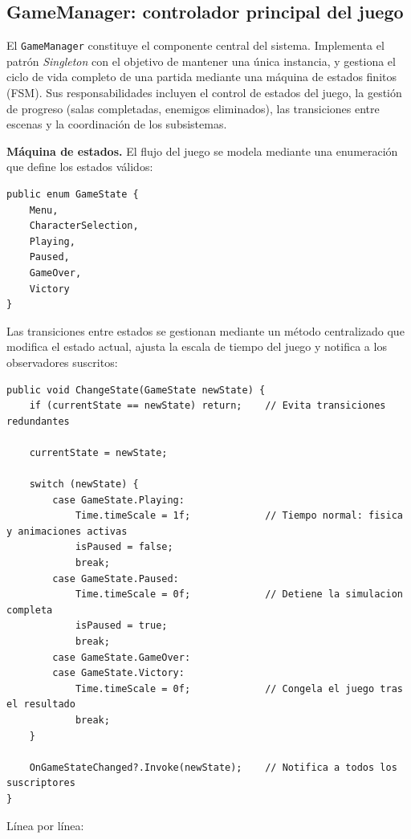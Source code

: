 \subsection{GameManager: controlador principal del juego}


El \texttt{GameManager} constituye el componente central del sistema. Implementa el patrón \textit{Singleton} con el objetivo de mantener una única instancia, y gestiona el ciclo de vida completo de una partida mediante una máquina de estados finitos (FSM). Sus responsabilidades incluyen el control de estados del juego, la gestión de progreso (salas completadas, enemigos eliminados), las transiciones entre escenas y la coordinación de los subsistemas.

\textbf{Máquina de estados.} El flujo del juego se modela mediante una enumeración que define los estados válidos:

\begin{lstlisting}
public enum GameState {
    Menu,
    CharacterSelection,
    Playing,
    Paused,
    GameOver,
    Victory
}
\end{lstlisting}


Las transiciones entre estados se gestionan mediante un método centralizado que modifica el estado actual, ajusta la escala de tiempo del juego y notifica a los observadores suscritos:

\begin{lstlisting}
public void ChangeState(GameState newState) {
    if (currentState == newState) return;    // Evita transiciones redundantes
    
    currentState = newState;
    
    switch (newState) {
        case GameState.Playing:
            Time.timeScale = 1f;             // Tiempo normal: fisica y animaciones activas
            isPaused = false;
            break;
        case GameState.Paused:
            Time.timeScale = 0f;             // Detiene la simulacion completa
            isPaused = true;
            break;
        case GameState.GameOver:
        case GameState.Victory:
            Time.timeScale = 0f;             // Congela el juego tras el resultado
            break;
    }
    
    OnGameStateChanged?.Invoke(newState);    // Notifica a todos los suscriptores
}
\end{lstlisting}


Línea por línea:

